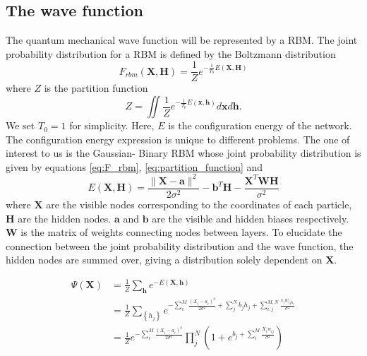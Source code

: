 \documentclass[11pt,a4paper,titlepage]{article}
\begin{document}
\subsection{The wave function}
The quantum mechanical wave function will be represented by a RBM. 
The joint probability distribution for a RBM is defined by the Boltzmann distribution
\begin{equation}\label{eq:F_rbm}
F_{r b m}(\mathbf{X}, \mathbf{H})=\frac{1}{Z} e^{-\frac{1}{T_{0}} E(\mathbf{X}, \mathbf{H})}
\end{equation}
where $Z$ is the partition function
\begin{equation}\label{eq:partition_function}
Z=\iint \frac{1}{Z} e^{-\frac{1}{T_{0}} E(\mathbf{x}, \mathbf{h})} d \mathbf{x} d \mathbf{h}.
\end{equation}
We set $T_0 = 1$ for simplicity. Here, $E$ is the configuration energy of the network. The configuration energy expression is unique to different problems. The one of interest to us is the Gaussian- Binary RBM whose joint probability distribution is given by equations \eqref{eq:F_rbm}, \eqref{eq:partition_function} and 
\begin{equation}
E(\mathbf{X}, \mathbf{H})=\frac{\|\mathbf{X}-\mathbf{a}\|^{2}}{2 \sigma^{2}}-\mathbf{b}^{T} \mathbf{H}-\frac{\mathbf{X}^{T} \mathbf{W H}}{\sigma^{2}}
\end{equation}
where $\mathbf{X}$ are the visible nodes corresponding to the coordinates of each particle, $\mathbf{H}$ are the hidden nodes. $\mathbf{a}$ and $\mathbf{b}$ are the visible and hidden biases respectively. $\mathbf{W}$ is the matrix of weights connecting nodes between layers. To elucidate the connection between the joint probability distribution and the wave function, the hidden nodes are summed over, giving a distribution solely dependent on $\mathbf{X}$.

\begin{equation}\label{eq:wavefunction}
\begin{aligned}
\Psi(\mathbf{X}) &=\frac{1}{Z} \sum_{\mathbf{h}} e^{-E(\mathbf{X}, \mathbf{h})}\\
&=\frac{1}{Z} \sum_{\left\{h_{j}\right\}} e^{-\sum_{i}^{M} \frac{\left(X_{i}-a_{i}\right)^{2}}{2 \sigma^{2}}+\sum_{j}^{N} b_{j} h_{j}+\sum_{i, j}^{M, N} \frac{x_{i} w_{i j h_{j}}}{\sigma^{2}}} \\
&=\frac{1}{Z} e^{-\sum_{i}^{M} \frac{\left(X_{i}-a_{i}\right)^{2}}{2 \sigma^{2}}} \prod_{j}^{N}\left(1+e^{b_{j}+\sum_{i}^{M} \frac{X_{i} w_{i j}}{\sigma^{2}}}\right)
\end{aligned}
\end{equation}
\end{document}
